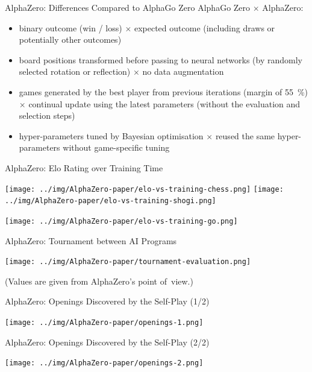 \documentclass{beamer}
\begin{document}
  {

    \begin{frame}{AlphaZero: Differences Compared to AlphaGo Zero}
      AlphaGo Zero $\times$ \alert{AlphaZero}:
      \pause
      \begin{itemize}[<+->]
        \item binary outcome (win / loss) $\times$ \alert{expected outcome (including draws or potentially other outcomes)}
        \item board positions transformed before passing to neural networks (by randomly selected rotation or reflection) $\times$ \alert{no data augmentation}
        \item games generated by the best player from previous iterations (margin of 55~\%) $\times$ \alert{continual update using the latest parameters (without the evaluation and selection steps)}
        \item hyper-parameters tuned by Bayesian optimisation $\times$ \alert{reused the same hyper-parameters without game-specific tuning}
      \end{itemize}
    \end{frame}

    \begin{frame}{AlphaZero: Elo Rating over Training Time}
      \begin{center}
        \pause
        \texttt{[image: ../img/AlphaZero-paper/elo-vs-training-chess.png]}
        \pause
        \texttt{[image: ../img/AlphaZero-paper/elo-vs-training-shogi.png]}

        \pause
        \texttt{[image: ../img/AlphaZero-paper/elo-vs-training-go.png]}
      \end{center}
    \end{frame}

    \begin{frame}{AlphaZero: Tournament between AI Programs}
      \begin{center}
        \texttt{[image: ../img/AlphaZero-paper/tournament-evaluation.png]}
      \end{center}

      {\tiny (Values are given from AlphaZero's point of~view.)}
    \end{frame}

    \begin{frame}{AlphaZero: Openings Discovered by the Self-Play (1/2)}
      \begin{center}
        \texttt{[image: ../img/AlphaZero-paper/openings-1.png]}
      \end{center}
    \end{frame}

    \begin{frame}{AlphaZero: Openings Discovered by the Self-Play (2/2)}
      \begin{center}
        \texttt{[image: ../img/AlphaZero-paper/openings-2.png]}
      \end{center}
    \end{frame}
  }
\end{document}
